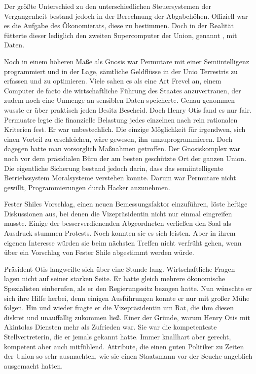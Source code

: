 \par

Der größte Unterschied zu den unterschiedlichen Steuersystemen der Vergangenheit bestand jedoch in der Berechnung der Abgabehöhen. 
Offiziell war es die Aufgabe des Ökonomierats, diese zu bestimmen.
Doch in der Realität fütterte dieser lediglich den zweiten Supercomputer der Union, genannt , mit Daten.

\par

Noch in einem höheren Maße als Gnosis war Permutare mit einer Semiintelligenz programmiert und in der Lage, sämtliche Geldflüsse in der Unio Terrestris zu erfassen und zu optimieren.
Viele sahen es als eine Art Frevel an, einem Computer de facto die wirtschaftliche Führung des Staates anzuvertrauen, der zudem noch eine Unmenge an sensiblen Daten speicherte.
Genau genommen wusste er über praktisch jeden Besitz Bescheid.
Doch Henry Otis fand es nur fair.
Permuatre legte die finanzielle Belastung jedes einzelnen nach rein rationalen Kriterien fest.
Er war unbestechlich.
Die einzige Möglichkeit für irgendwen, sich einen Vorteil zu erschleichen, wäre gewesen, ihn umzuprogrammieren.
Doch dagegen hatte man vorsorglich Maßnahmen getroffen.
Der Gnosiskomplex war noch vor dem präsidialen Büro der am besten geschützte Ort der ganzen Union.
Die eigentliche Sicherung bestand jedoch darin, dass das semiintelligente Betriebssystem Moralsysteme verstehen konnte.
Darum war Permutare nicht gewillt, Programmierungen durch Hacker anzunehmen.

\par

Fester Shiles Vorschlag, einen neuen Bemessungsfaktor einzuführen, löste heftige Diskussionen aus, bei denen die Vizepräsidentin nicht nur einmal eingreifen musste.
Einige der besserverdienenden Abgeordneten verließen den Saal als Ausdruck stummen Protests.
Noch konnten sie es sich leisten.
Aber in ihrem eigenen Interesse würden sie beim nächsten Treffen nicht verfrüht gehen, wenn über ein Vorschlag von Fester Shile abgestimmt werden würde.

\par

Präsident Otis langweilte sich über eine Stunde lang.
Wirtschaftliche Fragen lagen nicht auf seiner starken Seite.
Er hatte gleich mehrere ökonomische Spezialisten einberufen, als er den Regierungssitz bezogen hatte.
Nun wünschte er sich ihre Hilfe herbei, denn einigen Ausführungen konnte er nur mit großer Mühe folgen.
Hin und wieder fragte er die Vizepräsidentin um Rat, die ihm diesen diskret und unauffällig zukommen ließ.
Einer der Gründe, warum Henry Otis mit Akintolas Diensten mehr als Zufrieden war.
Sie war die kompetenteste Stellvertreterin, die er jemals gekannt hatte.
Immer knallhart aber gerecht, kompetent aber auch mitfühlend.
Attribute, die einen guten Politiker zu Zeiten der Union so sehr ausmachten, wie sie einen Staatsmann vor der Seuche angeblich ausgemacht hatten.

